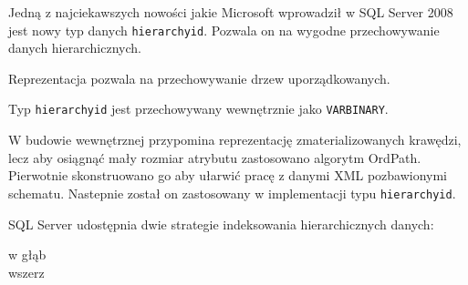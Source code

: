 
Jedną z najciekawszych nowości jakie Microsoft wprowadził w SQL Server 2008 jest nowy typ danych \texttt{hierarchyid}.
Pozwala on na wygodne przechowywanie danych hierarchicznych.





Reprezentacja pozwala na przechowywanie drzew uporządkowanych.



Typ \texttt{hierarchyid} jest przechowywany wewnętrznie jako \texttt{VARBINARY}.

W budowie wewnętrznej przypomina reprezentację zmaterializowanych krawędzi, 
lecz aby osiągnąć mały rozmiar atrybutu zastosowano algorytm OrdPath\cite{ordpath,kumaran}.
Pierwotnie  skonstruowano go aby ułarwić pracę z danymi XML pozbawionymi schematu.
Nastepnie został on zastosowany w implementacji typu \texttt{hierarchyid}.






SQL Server udostępnia dwie strategie indeksowania hierarchicznych danych:
\begin{description}
 \item[w głąb]  
 \item[wszerz]  
 \end{description}



